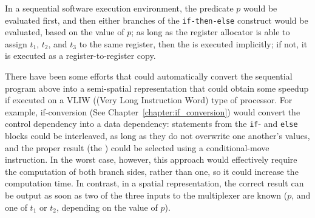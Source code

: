 In a sequential software execution environment, the predicate $p$ would be evaluated first, and then either branches of the {\tt if-then-else} construct would be evaluated, based on the value of $p$;  as long as the register allocator is able to assign $t_1$, $t_2$, and $t_3$ to the same register, then the \phifun is executed implicitly;  if not, it is executed as a register-to-register copy.

There have been some efforts that could automatically convert the sequential program above into a semi-spatial representation that could obtain some speedup if executed on a VLIW ((Very Long Instruction Word) type of processor. 
For example, if-conversion (See Chapter~\ref{chapter:if_conversion}) would convert the control dependency into a data dependency:  statements from the {\tt if}- and {\tt else} blocks could be interleaved, as long as they do not overwrite one another's values, and the proper result (the \phifun) could be selected using a conditional-move instruction. In the worst case, however, this approach would effectively require the computation of both branch sides, rather than one, so it could increase the computation time.  In contrast, in a spatial representation, the correct result can be output as soon as two of the three inputs to the multiplexer are known ($p$, and one of $t_1$ or $t_2$, depending on the value of $p$).

%

